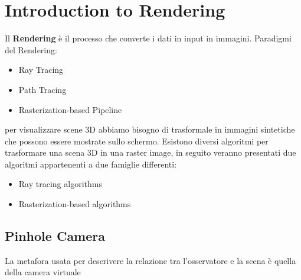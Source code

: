 \section{Introduction to Rendering}
Il \textbf{Rendering} è il processo che converte i dati in input in immagini.
Paradigmi del Rendering:
\begin{itemize}
    \item Ray Tracing
    \item Path Tracing
    \item Rasterization-based Pipeline
\end{itemize}
per visualizzare scene 3D abbiamo bisogno di trasformale in immagini sintetiche che possono essere mostrate sullo schermo.
Esistono diversi algoritmi per trasformare una scena 3D in una raster image, in seguito veranno presentati due algoritmi appartenenti a due famiglie differenti:
\begin{itemize}
    \item Ray tracing algorithms
    \item Rasterization-based algorithms
\end{itemize} 
\subsection{Pinhole Camera}
La metafora usata per descrivere la relazione tra l'osservatore e la scena è quella della camera virtuale